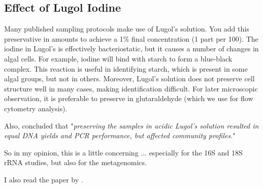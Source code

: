 \subsection{Effect of Lugol Iodine}
\label{task:20180306_cj1}

Many published sampling protocols make use of Lugol's solution. You add this preservative in amounts to achieve a 1\% final concentration (1 part per 100). The iodine in Lugol's is effectively bacteriostatic, but it causes a number of changes in algal cells. For example, iodine will bind with starch to form a blue-black complex. This reaction is useful in identifying starch, which is present in some algal groups, but not in others. Moreover, Lugol's solution does not preserve cell structure well in many cases, making identification difficult. For later microscopic observation, it is preferable to preserve in glutaraldehyde (which we use for flow cytometry analysis).

Also, \citet{maki2017sample} concluded that "\textit{preserving the samples in acidic Lugol’s solution resulted in equal DNA yields and PCR performance, but affected community profiles.}"

So in my opinion, this is a little concerning ... especially for the 16S and 18S rRNA studies, but also for the metagenomics. 


I also read the paper by \citet{williams2016marine}.